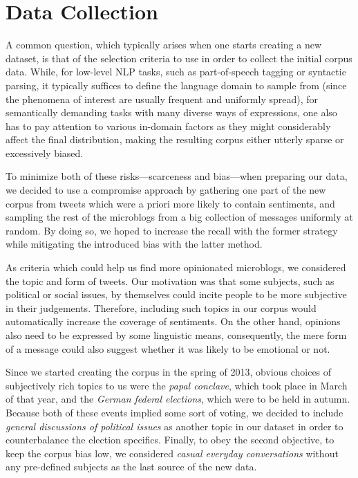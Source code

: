 \section{Data Collection}

A common question, which typically arises when one starts creating a
new dataset, is that of the selection criteria to use in order to
collect the initial corpus data.  While, for low-level NLP tasks, such
as part-of-speech tagging or syntactic parsing, it typically suffices
to define the language domain to sample from (since the phenomena of
interest are usually frequent and uniformly spread), for semantically
demanding tasks with many diverse ways of expressions, one also has to
pay attention to various in-domain factors as they might considerably
affect the final distribution, making the resulting corpus either
utterly sparse or excessively biased.

To minimize both of these risks---scarceness and bias---when preparing
our data, we decided to use a compromise approach by gathering one
part of the new corpus from tweets which were a priori more likely to
contain sentiments, and sampling the rest of the microblogs from a big
collection of messages uniformly at random.  By doing so, we hoped to
increase the recall with the former strategy while mitigating the
introduced bias with the latter method.

As criteria which could help us find more opinionated microblogs, we
considered the topic and form of tweets.  Our motivation was that some
subjects, such as political or social issues, by themselves could
incite people to be more subjective in their judgements.  Therefore,
including such topics in our corpus would automatically increase the
coverage of sentiments.  On the other hand, opinions also need to be
expressed by some linguistic means, consequently, the mere form of a
message could also suggest whether it was likely to be emotional or
not.

Since we started creating the corpus in the spring of 2013, obvious
choices of subjectively rich topics to us were the \emph{papal
  conclave}, which took place in March of that year, and the
\emph{German federal elections}, which were to be held in autumn.
Because both of these events implied some sort of voting, we decided
to include \emph{general discussions of political issues} as another
topic in our dataset in order to counterbalance the election
specifics.  Finally, to obey the second objective, \ie{} to keep the
corpus bias low, we considered \emph{casual everyday conversations}
without any pre-defined subjects as the last source of the new data.

